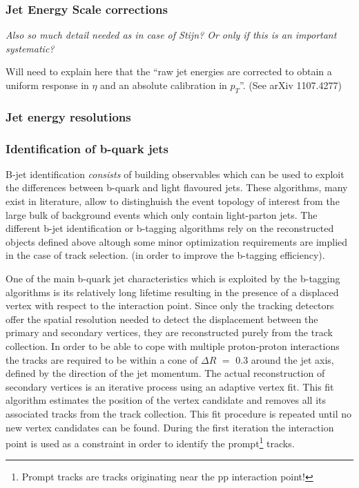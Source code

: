 \subsubsection*{Jet Energy Scale corrections}
\textit{Also so much detail needed as in case of Stijn? Or only if this is an important systematic?}

Will need to explain here that the ``raw jet energies are corrected to obtain a uniform response in $\eta$ and an absolute calibration in $p_T$''. (See arXiv 1107.4277)

\subsubsection*{Jet energy resolutions}

\subsubsection*{Identification of b-quark jets}

B-jet identification \textit{consists} of building observables which can be used to exploit the differences between b-quark and light flavoured jets. These algorithms, many exist in literature, allow to distinghuish the event topology of interest from the large bulk of background events which only contain light-parton jets.
The different b-jet identification or b-tagging algorithms rely on the reconstructed objects defined above altough some minor optimization requirements are implied in the case of track selection. (in order to improve the b-tagging efficiency).

One of the main b-quark jet characteristics which is exploited by the b-tagging algorithms is its relatively long lifetime resulting in the presence of a displaced vertex with respect to the interaction point. Since only the tracking detectors offer the spatial resolution needed to detect the displacement between the primary and secondary vertices, they are reconstructed purely from the track collection. In order to be able to cope with multiple proton-proton interactions the tracks are required to be within a cone of $\Delta R$ $=$ $0.3$ around the jet axis, defined by the direction of the jet momentum. 
The actual reconstruction of secondary vertices is an iterative process using an adaptive vertex fit. This fit algorithm estimates the position of the vertex candidate and removes all its associated tracks from the track collection. This fit procedure is repeated until no new vertex candidates can be found. During the first iteration the interaction point is used as a constraint in order to identify the prompt\footnote{Prompt tracks are tracks originating near the pp interaction point!} tracks.

